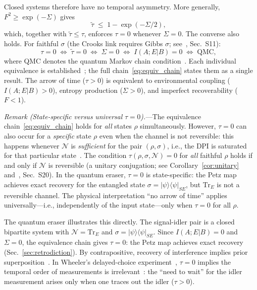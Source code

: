 \documentclass[prl,twocolumn,superscriptaddress,longbibliography,floatfix]{revtex4-2}
\newcommand{\Tr}{\mathrm{Tr}}
\newcommand{\chan}{\mathcal{N}}
\newcommand{\ket}[1]{|#1\rangle}
\newcommand{\bra}[1]{\langle#1|}
\newcommand{\tauasym}{\tau}
\newcommand{\taurot}{\tilde{\tau}}
\begin{document}
Closed systems therefore have no temporal asymmetry.  More generally,
$F^2 \geq \exp(-\Sigma)$ gives
\begin{equation}
\taurot \;\leq\; 1 - \exp(-\Sigma/2),
\label{eq:tau_bound}
\end{equation}
which, together with $\taurot \leq \tauasym$, enforces
$\tauasym = 0$ whenever $\Sigma = 0$.
The converse also holds.  For faithful $\sigma$
(the Crooks link requires Gibbs $\sigma$;
see~\cite{SM}, Sec.~S11):
\begin{equation}
\tauasym = 0 \;\Longleftrightarrow\; \taurot = 0
\;\Longleftrightarrow\; \Sigma = 0
\;\Longleftrightarrow\; I(A;E|B) = 0
\;\Longleftrightarrow\; \text{QMC},
\label{eq:equiv_chain}
\end{equation}
where QMC denotes the quantum Markov chain
condition~\cite{Fawzi2015}. Each individual equivalence is
established~\cite{Petz1988,Fawzi2015,Landi2021}; the full
chain~\eqref{eq:equiv_chain} states them as a single result.
The arrow of time ($\tauasym > 0$) is equivalent to environmental
coupling ($I(A;E|B) > 0$), entropy production ($\Sigma > 0$),
and imperfect recoverability ($F < 1$).

\emph{Remark (State-specific versus universal $\tauasym = 0$).}---The
equivalence chain~\eqref{eq:equiv_chain} holds for
\emph{all} states $\rho$ simultaneously.  However, $\tauasym = 0$
can also occur for a \emph{specific} state $\rho$ even when the
channel is not reversible: this happens whenever $\chan$ is
\emph{sufficient} for the pair $(\rho, \sigma)$, i.e., the DPI is
saturated for that particular state~\cite{Petz1988}.
The condition $\tauasym(\rho, \sigma, \chan) = 0$ for \emph{all}
faithful $\rho$ holds if and only if $\chan$ is reversible (a unitary
conjugation; see Corollary~\ref{cor:unitary} and~\cite{SM}, Sec.~S20).
In the quantum eraser, $\tauasym = 0$ is state-specific: the
Petz map achieves exact recovery for the entangled state
$\sigma = \ket{\psi}\!\bra{\psi}_{SE}$, but $\Tr_E$ is not a
reversible channel.
The physical interpretation ``no arrow of time'' applies
universally---i.e., independently of the input state---only
when $\tauasym = 0$ for all $\rho$.

The quantum eraser illustrates this directly.
The signal-idler pair is a closed bipartite system with
$\chan = \Tr_E$ and $\sigma = \ket{\psi}\bra{\psi}_{SE}$.
Since $I(A;E|B) = 0$ and $\Sigma = 0$, the equivalence chain
gives $\tauasym = 0$: the Petz map achieves exact recovery
(Sec.~\ref{sec:retrodiction}).
By contrapositive, recovery of interference
implies prior superposition~\cite{SM}.
In Wheeler's delayed-choice experiment~\cite{Wheeler1978},
$\tauasym = 0$ implies the temporal order of measurements is
irrelevant~\cite{Zurek2003}: the ``need to wait'' for the idler
measurement arises only when one traces out the idler
($\tauasym > 0$).
\end{document}
